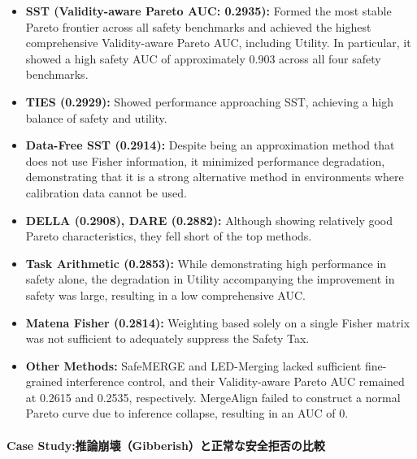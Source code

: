 \documentclass{article}
\begin{document}
\begin{itemize}
    \item \textbf{SST (Validity-aware Pareto AUC: 0.2935):}
    Formed the most stable Pareto frontier across all safety benchmarks and achieved the highest comprehensive Validity-aware Pareto AUC, including Utility. In particular, it showed a high safety AUC of approximately 0.903 across all four safety benchmarks.
    \item \textbf{TIES (0.2929):}
    Showed performance approaching SST, achieving a high balance of safety and utility.
    \item \textbf{Data-Free SST (0.2914):}
    Despite being an approximation method that does not use Fisher information, it minimized performance degradation, demonstrating that it is a strong alternative method in environments where calibration data cannot be used.
    \item \textbf{DELLA (0.2908), DARE (0.2882):}
    Although showing relatively good Pareto characteristics, they fell short of the top methods.
    \item \textbf{Task Arithmetic (0.2853):}
    While demonstrating high performance in safety alone, the degradation in Utility accompanying the improvement in safety was large, resulting in a low comprehensive AUC.
    \item \textbf{Matena Fisher (0.2814):}
    Weighting based solely on a single Fisher matrix was not sufficient to adequately suppress the Safety Tax.
    \item \textbf{Other Methods:}
    SafeMERGE and LED-Merging lacked sufficient fine-grained interference control, and their Validity-aware Pareto AUC remained at 0.2615 and 0.2535, respectively. MergeAlign failed to construct a normal Pareto curve due to inference collapse, resulting in an AUC of 0.
\end{itemize}

\paragraph{Case Study:推論崩壊（Gibberish）と正常な安全拒否の比較}


\end{document}
